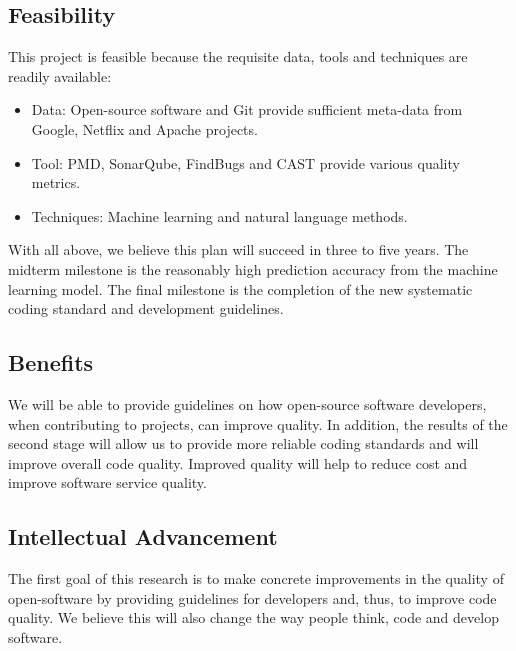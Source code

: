 \subsection{Feasibility}
This project is feasible because the requisite data, tools and techniques are readily available:
\begin{itemize}
    \item Data: Open-source software and Git provide sufficient meta-data from Google, Netflix and Apache projects.
    \item Tool: PMD, SonarQube, FindBugs and CAST provide various quality metrics.
    \item Techniques: Machine learning and natural language methods.
\end{itemize}
With all above, we believe this plan will succeed in three to five years.
The midterm milestone is the reasonably high prediction accuracy from the machine learning model.
The final milestone is the completion of the new systematic coding standard and development guidelines.

\subsection{Benefits}

We will be able to provide guidelines on how open-source software developers, when contributing to projects,  can improve quality. 
In addition, the results of the second stage will allow us to provide more reliable coding standards and will improve overall code quality.
Improved quality will help to reduce cost and improve software service quality.

\subsection{Intellectual Advancement}

The first goal of this research is to make concrete improvements in the quality of open-software by providing guidelines for developers and, thus, to improve code quality. 
We believe this will also change the way people think, code and develop software.
